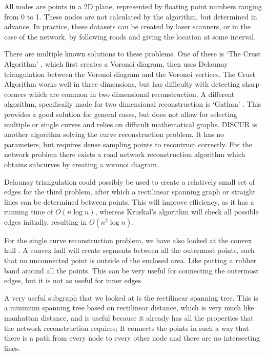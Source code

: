 \documentclass[11pt]{article}
\begin{document}
All nodes are points in a 2D plane, represented by floating point numbers ranging from 0 to 1. These nodes are not calculated by the algorithm, but determined in advance. In practice, these datasets can be created by laser scanners, or in the case of the network, by following roads and giving the location at some interval.

There are multiple known solutions to these problems. One of these is `The Crust Algorithm' \cite{crust}, which first creates a Voronoi diagram, then uses Delaunay triangulation between the Voronoi diagram and the Voronoi vertices. The Crust Algorithm works well in three dimensions, but has difficulty with detecting sharp corners which are common in two dimensional reconstruction.
A different algorithm, specifically made for two dimensional reconstruction is `Gathan' \cite{gathan}. This provides a good solution for general cases, but does not allow for selecting multiple or single curves and relies on difficult mathematical graphs.
DISCUR \cite{discur} is another algorithm solving the curve reconstruction problem. It has no parameters, but requires dense sampling points to recontruct correctly.
For the network problem there exists a road network reconstruction algorithm \cite{chen} which obtains subcurves by creating a voronoi diagram.

Delaunay triangulation \cite{delaunay} could possibly be used to create a relatively small set of edges for the third problem, after which a rectilinear spanning graph or straight lines can be determined between points. This will improve efficiency, as it has a running time of $O(n \log{n})$, whereas Kruskal's algorithm will check all possible edges initially, resulting in $O(n^2 \log{n})$.

For the single curve reconstruction problem, we have also looked at the convex hull \cite{convex}. A convex hull will create segments between all the outermost points, such that no unconnected point is outside of the enclosed area. Like putting a rubber band around all the points. This can be very useful for connecting the outermost edges, but it is not as useful for inner edges.

A very useful subgraph that we looked at is the rectilinear spanning tree. This is a minimum spanning tree based on rectilinear distance, which is very much like manhattan distance, and is useful because it already has all the properties that the network reconstruction requires; It connects the points in such a way that there is a path from every node to every other node and there are no intersecting lines.
\end{document}
